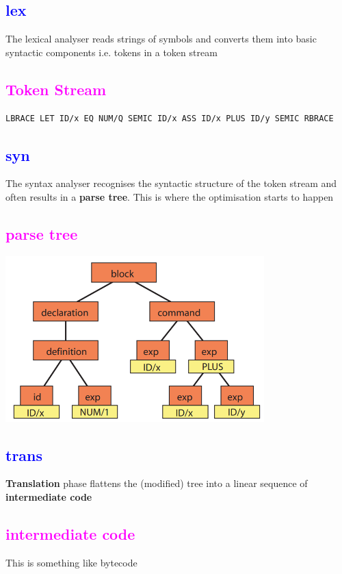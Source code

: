 \documentclass{article}[18pt]
\begin{document}
\subsection{\textcolor{blue}{lex}}
The lexical analyser reads strings of symbols and converts them into basic syntactic components i.e. tokens in a token stream
\subsection{\textcolor{magenta}{Token Stream}}
\begin{lstlisting}[mathescape=true]
LBRACE LET ID/x EQ NUM/Q SEMIC ID/x ASS ID/x PLUS ID/y SEMIC RBRACE
\end{lstlisting}
\subsection{\textcolor{blue}{syn}} 
The syntax analyser recognises the syntactic structure of the token stream and often results in a \textbf{parse tree}. This is where the optimisation starts to happen
\subsection{\textcolor{magenta}{parse tree}}
\begin{center}
\includegraphics[width=10cm]{parse_tree.png}
\end{center}
\subsection{\textcolor{blue}{trans}}
\textbf{Translation} phase flattens the (modified) tree into a linear sequence of \textbf{intermediate code}
\subsection{\textcolor{magenta}{intermediate code}}
This is something like bytecode
\end{document}
